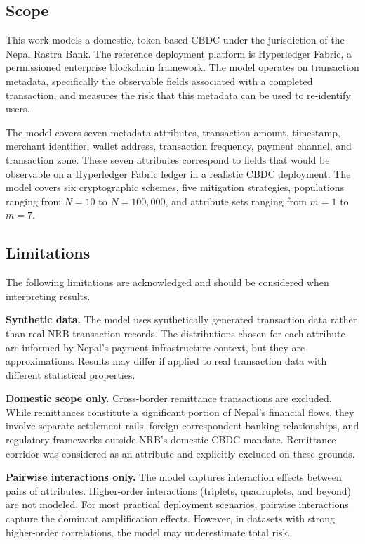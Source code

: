 \subsection{Scope}

This work models a domestic, token-based CBDC under the
jurisdiction of the Nepal Rastra Bank. The reference
deployment platform is Hyperledger Fabric, a permissioned
enterprise blockchain framework. The model operates on
transaction metadata, specifically the observable fields associated
with a completed transaction, and measures the risk that
this metadata can be used to re-identify users.

The model covers seven metadata attributes, transaction
amount, timestamp, merchant identifier, wallet address,
transaction frequency, payment channel, and transaction
zone. These seven attributes correspond to fields that would
be observable on a Hyperledger Fabric ledger in a realistic
CBDC deployment. The model covers six cryptographic schemes,
five mitigation strategies, populations ranging from
$N = 10$ to $N = 100{,}000$, and attribute sets ranging
from $m = 1$ to $m = 7$.

\subsection{Limitations}

The following limitations are acknowledged and should be
considered when interpreting results.

\textbf{Synthetic data.} The model uses synthetically
generated transaction data rather than real NRB transaction
records. The distributions chosen for each attribute are
informed by Nepal's payment infrastructure context, but
they are approximations. Results may differ if applied to
real transaction data with different statistical properties.

\textbf{Domestic scope only.} Cross-border remittance
transactions are excluded. While remittances constitute
a significant portion of Nepal's financial flows,
they involve separate settlement rails, foreign
correspondent banking relationships, and regulatory
frameworks outside NRB's domestic CBDC mandate.
Remittance corridor was considered as an attribute
and explicitly excluded on these grounds.

\textbf{Pairwise interactions only.} The model captures
interaction effects between pairs of attributes. Higher-order
interactions (triplets, quadruplets, and beyond) are
not modeled. For most practical deployment scenarios,
pairwise interactions capture the dominant amplification
effects. However, in datasets with strong higher-order
correlations, the model may underestimate total risk.

